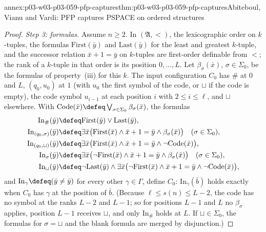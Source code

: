 \begin{annexitem}{annex:p03-w03-p03-059-pfp-captures}{thm:p03-w03-p03-059-pfp-captures}{Abiteboul, Vianu and Vardi: PFP captures PSPACE on ordered structures}
\begin{proof}
\emph{Step 3: formulas.} Assume \(n\geq2\). In \((\mathfrak A,<)\), the
lexicographic order on \(k\)-tuples, the formulas \(\mathrm{First}(\bar y)\)
and \(\mathrm{Last}(\bar y)\) for the least and greatest \(k\)-tuple, and
the successor relation \(\bar x+1=\bar y\) on \(k\)-tuples are first-order
definable from \(<\); the rank of a \(k\)-tuple in that order is its
position \(0,\ldots,L\). Let \(\beta_\sigma(\bar x)\), \(\sigma\in\Sigma_0\),
be the formulas of property~(iii) for this \(k\). The input configuration
\(C_0\) has \(\#\) at \(0\) and \(L\), \((q_0,u_0)\) at \(1\) (with
\(u_0\) the first symbol of the code, or \(\sqcup\) if the code is empty),
the code symbol \(u_{i-1}\) at each position \(i\) with
\(2\leq i\leq\ell\), and \(\sqcup\) elsewhere. With
\(\mathrm{Code}(\bar x)\defeq\bigvee_{\sigma\in\Sigma_0}\beta_\sigma(\bar x)\),
the formulas
\[
\begin{aligned}
 \mathrm{In}_\#(\bar y)&\defeq\mathrm{First}(\bar y)\lor\mathrm{Last}(\bar y),\\
 \mathrm{In}_{(q_0,\sigma)}(\bar y)&\defeq\exists\bar x\bigl(\mathrm{First}(\bar x)
   \land\bar x+1=\bar y\land\beta_\sigma(\bar x)\bigr)\quad(\sigma\in\Sigma_0),\\
 \mathrm{In}_{(q_0,\sqcup)}(\bar y)&\defeq\exists\bar x\bigl(\mathrm{First}(\bar x)
   \land\bar x+1=\bar y\land\neg\mathrm{Code}(\bar x)\bigr),\\
 \mathrm{In}_{\sigma}(\bar y)&\defeq\exists\bar x\bigl(\neg\mathrm{First}(\bar x)
   \land\bar x+1=\bar y\land\beta_\sigma(\bar x)\bigr)\quad(\sigma\in\Sigma_0),\\
 \mathrm{In}_{\sqcup}(\bar y)&\defeq\neg\mathrm{Last}(\bar y)\land
   \exists\bar x\bigl(\neg\mathrm{First}(\bar x)\land\bar x+1=\bar y
   \land\neg\mathrm{Code}(\bar x)\bigr),
\end{aligned}
\]
and \(\mathrm{In}_\gamma\defeq(\bar y\neq\bar y)\) for every other
\(\gamma\in\Gamma\), define \(C_0\): \(\mathrm{In}_\gamma(\bar b)\) holds
exactly when \(C_0\) has \(\gamma\) at the position of \(\bar b\). (Because
\(\ell\leq s(n)\leq L-2\), the code has no symbol at the ranks \(L-2\) and
\(L-1\); so for positions \(L-1\) and \(L\) no \(\beta_\sigma\) applies,
position \(L-1\) receives \(\sqcup\), and only \(\mathrm{In}_\#\) holds at
\(L\).
If \(\sqcup\in\Sigma_0\), the formulas for \(\sigma=\sqcup\) and the blank
formula are merged by disjunction.)


\end{proof}
\end{annexitem}
